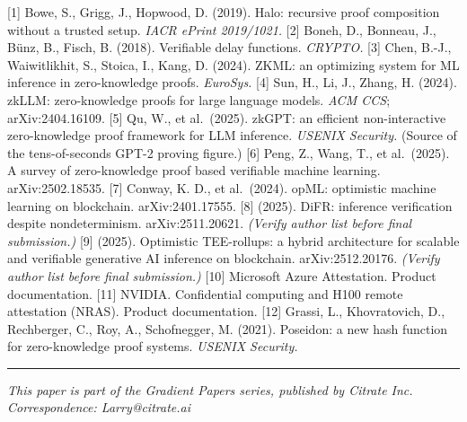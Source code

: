 {[}1{]} Bowe, S., Grigg, J., Hopwood, D. (2019). Halo: recursive proof
composition without a trusted setup. \emph{IACR ePrint 2019/1021.}
{[}2{]} Boneh, D., Bonneau, J., Bünz, B., Fisch, B. (2018). Verifiable
delay functions. \emph{CRYPTO.} {[}3{]} Chen, B.-J., Waiwitlikhit, S.,
Stoica, I., Kang, D. (2024). ZKML: an optimizing system for ML inference
in zero-knowledge proofs. \emph{EuroSys.} {[}4{]} Sun, H., Li, J.,
Zhang, H. (2024). zkLLM: zero-knowledge proofs for large language
models. \emph{ACM CCS}; arXiv:2404.16109. {[}5{]} Qu, W., et al.~(2025).
zkGPT: an efficient non-interactive zero-knowledge proof framework for
LLM inference. \emph{USENIX Security.} (Source of the tens-of-seconds
GPT-2 proving figure.) {[}6{]} Peng, Z., Wang, T., et al.~(2025). A
survey of zero-knowledge proof based verifiable machine learning.
arXiv:2502.18535. {[}7{]} Conway, K. D., et al.~(2024). opML: optimistic
machine learning on blockchain. arXiv:2401.17555. {[}8{]} (2025). DiFR:
inference verification despite nondeterminism. arXiv:2511.20621.
\emph{(Verify author list before final submission.)} {[}9{]} (2025).
Optimistic TEE-rollups: a hybrid architecture for scalable and
verifiable generative AI inference on blockchain. arXiv:2512.20176.
\emph{(Verify author list before final submission.)} {[}10{]} Microsoft
Azure Attestation. Product documentation. {[}11{]} NVIDIA. Confidential
computing and H100 remote attestation (NRAS). Product documentation.
{[}12{]} Grassi, L., Khovratovich, D., Rechberger, C., Roy, A.,
Schofnegger, M. (2021). Poseidon: a new hash function for zero-knowledge
proof systems. \emph{USENIX Security.}

\begin{center}\rule{0.5\linewidth}{0.5pt}\end{center}

\emph{This paper is part of the Gradient Papers series, published by
Citrate Inc.} \emph{Correspondence: Larry@citrate.ai}
